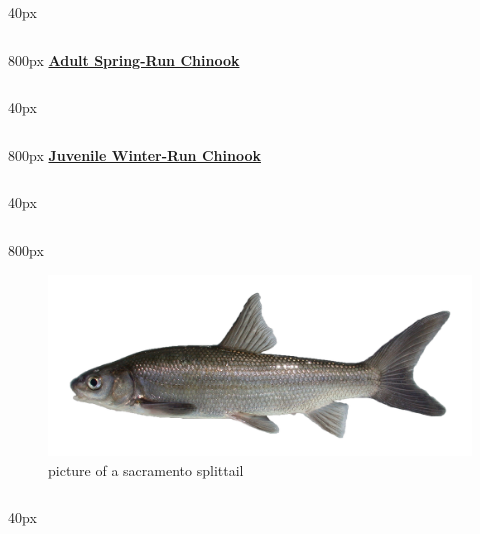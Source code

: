 \documentclass[
]{book}
\begin{document}
\begin{column}{40px\textwidth}
~
\end{column}

\begin{column}{800px\textwidth}
\textbf{\href{http://calfish.ucdavis.edu/species/?uid=28\&ds=698}{Adult Spring-Run Chinook}}
\end{column}

\begin{column}{40px\textwidth}
~
\end{column}

\begin{column}{800px\textwidth}
\textbf{\href{http://calfish.ucdavis.edu/species/?uid=30\&ds=698}{Juvenile Winter-Run Chinook}}
\end{column}

\begin{column}{40px\textwidth}
~
\end{column}

\begin{column}{800px\textwidth}
\begin{figure}

{\centering \includegraphics[width=29.17in]{figures/splittail_adult} 

}

\caption{picture of a sacramento splittail}\label{fig:unnamed-chunk-32}
\end{figure}
\end{column}

\begin{column}{40px\textwidth}
~
\end{column}
\end{document}
